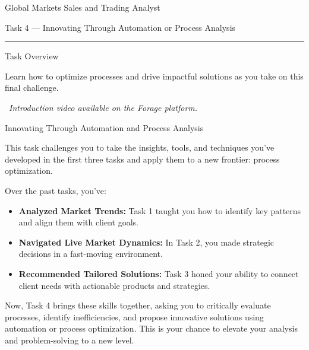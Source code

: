 \documentclass[11pt]{article}
\begin{document}
{\LARGE Global Markets Sales and Trading Analyst}\par\medskip
{\large Task 4 --- Innovating Through Automation or Process Analysis}\par
{\color{rulegray}\rule{\linewidth}{0.6pt}}\par\bigskip

{\fontsize{26}{30}\selectfont Task Overview}\par\bigskip



Learn how to optimize processes and drive impactful solutions as you take on
this final challenge.\par\medskip
{\color{gray}\faPlayCircle\ \textit{Introduction video available on the Forage
platform.}}

\newpage
{\fontsize{26}{30}\selectfont Innovating Through Automation and Process Analysis}\par\bigskip

This task challenges you to take the insights, tools, and techniques you've
developed in the first three tasks and apply them to a new frontier: process
optimization.

Over the past tasks, you've:
\begin{itemize}[leftmargin=1.5em, itemsep=2pt]
  \item \textbf{Analyzed Market Trends:} Task 1 taught you how to identify key
  patterns and align them with client goals.
  \item \textbf{Navigated Live Market Dynamics:} In Task 2, you made strategic
  decisions in a fast-moving environment.
  \item \textbf{Recommended Tailored Solutions:} Task 3 honed your ability to
  connect client needs with actionable products and strategies.
\end{itemize}
Now, Task 4 brings these skills together, asking you to critically evaluate
processes, identify inefficiencies, and propose innovative solutions using
automation or process optimization. This is your chance to elevate your
analysis and problem-solving to a new level.
\end{document}

